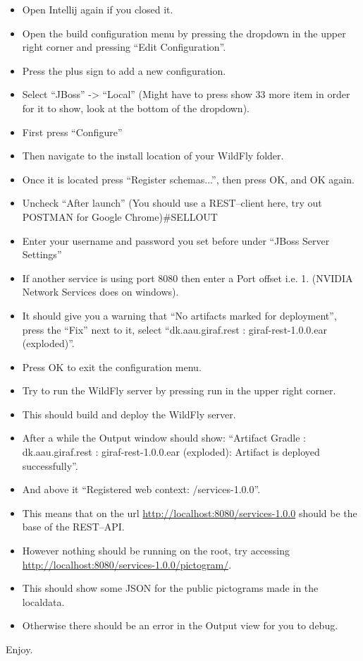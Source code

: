 \begin{itemize}
    \item Open Intellij again if you closed it. 
    \item Open the build configuration menu by pressing the dropdown in the upper right corner and pressing ``Edit Configuration''.
    \item Press the plus sign to add a new configuration.
    \item Select ``JBoss'' -> ``Local'' (Might have to press show 33 more item in order for it to show, look at the bottom of the dropdown).
    \item First press ``Configure''
    \item Then navigate to the install location of your WildFly folder.
    \item Once it is located press ``Register schemas...'', then press OK, and OK again.
    \item Uncheck ``After launch'' (You should use a REST--client here, try out POSTMAN for Google Chrome)\#SELLOUT
    \item Enter your username and password you set before under ``JBoss Server Settings''
    \item If another service is using port 8080 then enter a Port offset i.e. 1. (NVIDIA Network Services does on windows).
    \item It should give you a warning that ``No artifacts marked for deployment'', press the ``Fix'' next to it, select ``dk.aau.giraf.rest :
giraf-rest-1.0.0.ear (exploded)''.
    \item Press OK to exit the configuration menu.
    \item Try to run the WildFly server by pressing run in the upper right corner.
    \item This should build and deploy the WildFly server.
    \item After a while the Output window should show: ``Artifact Gradle : dk.aau.giraf.rest : giraf-rest-1.0.0.ear (exploded): Artifact is deployed
successfully''.
    \item And above it ``Registered web context: /services-1.0.0''.
    \item This means that on the url \url{http://localhost:8080/services-1.0.0} should be the base of the REST--API.
    \item However nothing should be running on the root, try accessing \url{http://localhost:8080/services-1.0.0/pictogram/}.
    \item This should show some JSON for the public pictograms made in the localdata.
    \item Otherwise there should be an error in the Output view for you to debug.
\end{itemize}

Enjoy.
